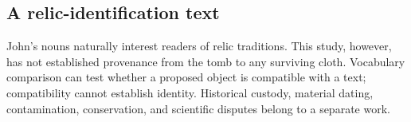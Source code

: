 \subsection{A relic-identification text}

John's nouns naturally interest readers of relic traditions. This study,
however, has not established provenance from the tomb to any surviving cloth.
Vocabulary comparison can test whether a proposed object is compatible with a
text; compatibility cannot establish identity. Historical custody, material
dating, contamination, conservation, and scientific disputes belong to a
separate work.

